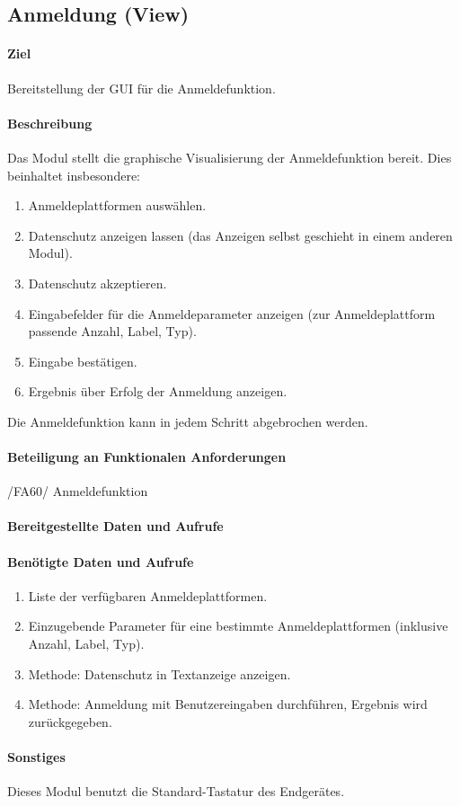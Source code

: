 \subsection{Anmeldung (View)}
\paragraph{Ziel}
Bereitstellung der GUI für die Anmeldefunktion.
\paragraph{Beschreibung}
Das Modul stellt die graphische Visualisierung der Anmeldefunktion bereit.
Dies beinhaltet insbesondere:
\begin{enumerate}
    \item Anmeldeplattformen auswählen.
    \item Datenschutz anzeigen lassen (das Anzeigen selbst geschieht in einem anderen Modul).
    \item Datenschutz akzeptieren.
    \item Eingabefelder für die Anmeldeparameter anzeigen (zur Anmeldeplattform passende Anzahl, Label, Typ).
    \item Eingabe bestätigen.
    \item Ergebnis über Erfolg der Anmeldung anzeigen.
\end{enumerate}
Die Anmeldefunktion kann in jedem Schritt abgebrochen werden.
\paragraph{Beteiligung an Funktionalen Anforderungen}
/FA60/ Anmeldefunktion
\paragraph{Bereitgestellte Daten und Aufrufe}

\paragraph{Benötigte Daten und Aufrufe}
\begin{enumerate}
    \item Liste der verfügbaren Anmeldeplattformen.
    \item Einzugebende Parameter für eine bestimmte Anmeldeplattformen (inklusive Anzahl, Label, Typ).
    \item Methode: Datenschutz in Textanzeige anzeigen.
    \item Methode: Anmeldung mit Benutzereingaben durchführen, Ergebnis wird zurückgegeben.
\end{enumerate}
\paragraph{Sonstiges}
Dieses Modul benutzt die Standard-Tastatur des Endgerätes.